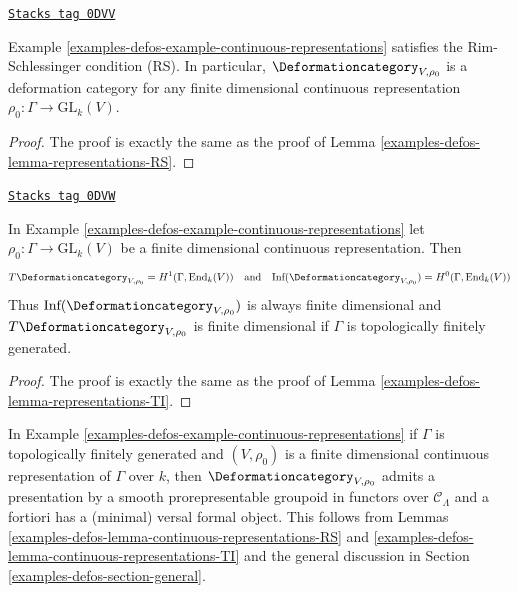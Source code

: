 \begin{lemma}
\label{examples-defos-lemma-continuous-representations-RS}
\href{https://stacks.math.columbia.edu/tag/0DVV}{\texttt{Stacks tag 0DVV}}

Example \ref{examples-defos-example-continuous-representations}
satisfies the Rim-Schlessinger condition (RS).
In particular, $\Deformationcategory_{V, \rho_0}$ is a deformation category
for any finite dimensional continuous representation
$\rho_0 : \Gamma \to \text{GL}_k(V)$.
\end{lemma}

\begin{proof}
The proof is exactly the same as the proof of
Lemma \ref{examples-defos-lemma-representations-RS}.
\end{proof}

\begin{lemma}
\label{examples-defos-lemma-continuous-representations-TI}
\href{https://stacks.math.columbia.edu/tag/0DVW}{\texttt{Stacks tag 0DVW}}

In Example \ref{examples-defos-example-continuous-representations} let
$\rho_0 : \Gamma \to \text{GL}_k(V)$ be a finite dimensional
continuous representation. Then
$$
T\Deformationcategory_{V, \rho_0} = H^1(\Gamma, \text{End}_k(V))
\quad\text{and}\quad
\text{Inf}(\Deformationcategory_{V, \rho_0}) = H^0(\Gamma, \text{End}_k(V))
$$
Thus $\text{Inf}(\Deformationcategory_{V, \rho_0})$
is always finite dimensional
and $T\Deformationcategory_{V, \rho_0}$ is finite dimensional
if $\Gamma$ is topologically finitely generated.
\end{lemma}

\begin{proof}
The proof is exactly the same as the proof of
Lemma \ref{examples-defos-lemma-representations-TI}.
\end{proof}

In Example \ref{examples-defos-example-continuous-representations} if $\Gamma$
is topologically finitely generated
and $(V, \rho_0)$ is a finite dimensional continuous representation of $\Gamma$
over $k$, then $\Deformationcategory_{V, \rho_0}$
admits a presentation by a smooth prorepresentable groupoid in functors
over $\mathcal{C}_\Lambda$
and a fortiori has a (minimal) versal formal object. This follows
from Lemmas \ref{examples-defos-lemma-continuous-representations-RS} and
\ref{examples-defos-lemma-continuous-representations-TI}
and the general discussion in Section \ref{examples-defos-section-general}.

